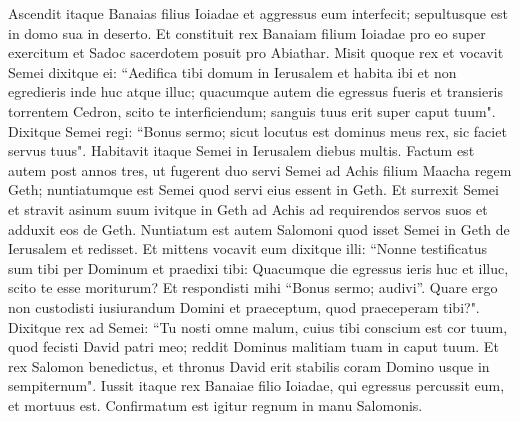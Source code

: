 \begin{biblechapter}
\verse Ascendit itaque Banaias filius Ioiadae et aggressus eum interfecit; sepultusque est in domo sua in deserto. 
\verse Et constituit rex Banaiam filium Ioiadae pro eo super exercitum et Sadoc sacerdotem posuit pro Abiathar. 
\verse Misit quoque rex et vocavit Semei dixitque ei: “Aedifica tibi domum in Ierusalem et habita ibi et non egredieris inde huc atque illuc; 
\verse quacumque autem die egressus fueris et transieris torrentem Cedron, scito te interficiendum; sanguis tuus erit super caput tuum". 
\verse Dixitque Semei regi: “Bonus sermo; sicut locutus est dominus meus rex, sic faciet servus tuus". Habitavit itaque Semei in Ierusalem diebus multis. 
\verse Factum est autem post annos tres, ut fugerent duo servi Semei ad Achis filium Maacha regem Geth; nuntiatumque est Semei quod servi eius essent in Geth. 
\verse Et surrexit Semei et stravit asinum suum ivitque in Geth ad Achis ad requirendos servos suos et adduxit eos de Geth. 
\verse Nuntiatum est autem Salomoni quod isset Semei in Geth de Ierusalem et redisset. 
\verse Et mittens vocavit eum dixitque illi: “Nonne testificatus sum tibi per Dominum et praedixi tibi: Quacumque die egressus ieris huc et illuc, scito te esse moriturum? Et respondisti mihi “Bonus sermo; audivi”. 
\verse Quare ergo non custodisti iusiurandum Domini et praeceptum, quod praeceperam tibi?". 
\verse Dixitque rex ad Semei: “Tu nosti omne malum, cuius tibi conscium est cor tuum, quod fecisti David patri meo; reddit Dominus malitiam tuam in caput tuum. 
\verse Et rex Salomon benedictus, et thronus David erit stabilis coram Domino usque in sempiternum". 
\verse Iussit itaque rex Banaiae filio Ioiadae, qui egressus percussit eum, et mortuus est. Confirmatum est igitur regnum in manu Salomonis. 
\end{biblechapter}

